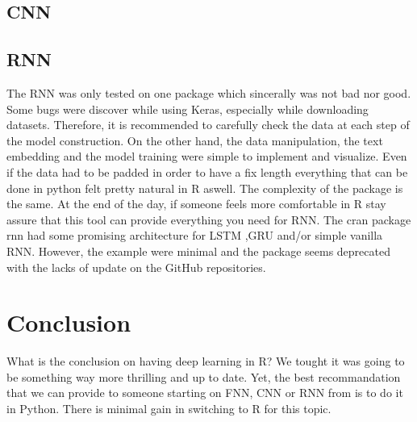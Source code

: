 \documentclass[letter,8pt]{article}\usepackage[]{graphicx}\usepackage[]{color}
\begin{document}
\subsection{CNN}
\subsection{RNN}
The RNN was only tested on one package which sincerally was not bad nor good. Some bugs were discover while using Keras, especially while downloading datasets. Therefore, it is recommended to carefully check the data at each step of the model construction. On the other hand,
the data manipulation, the text embedding and the model training were simple to implement and visualize. Even if the data had to be padded in order to have a fix length everything that can be done in python felt pretty natural in R aswell. The complexity of the package is the same. At the end of the day, if someone feels more comfortable in R stay assure that this tool can provide everything you need for RNN. The cran package rnn \cite{rnn2019} had some promising architecture for LSTM ,GRU and/or simple vanilla RNN. However, the example were minimal and the package seems deprecated with the lacks of update on the GitHub repositories.

\section{Conclusion}
What is the conclusion on having deep learning in R? We tought it was going to be something way more thrilling and up to date. Yet, the best recommandation that we can provide to someone starting on FNN, CNN or RNN from is to do it in Python. There is minimal gain in switching to R for this topic. 

\newpage
\pagestyle{plain}

\end{document}
